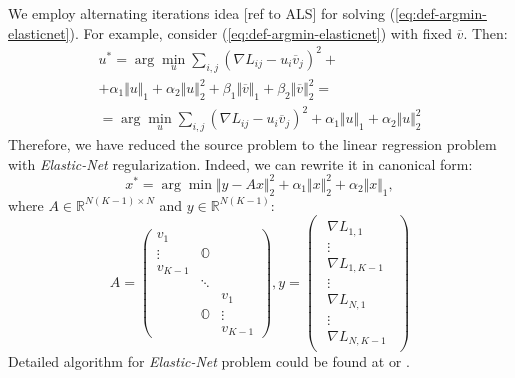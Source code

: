 \documentclass{article}
\begin{document}
We employ alternating iterations idea [ref to ALS] for solving (\ref{eq:def-argmin-elasticnet}). For example, consider (\ref{eq:def-argmin-elasticnet}) with fixed $\overline{v}$. Then:
\begin{multline*}
	u^{*} = \arg\min_{u}\sum_{i,j}\left(\nabla L_{ij}-u_{i}\overline{v}_{j}\right)^{2} + \\
	+ \alpha_{1}\Vert u\Vert_{1}+\alpha_{2}\Vert u\Vert_{2}^{2}
	+ \beta_{1}\Vert\overline{v}\Vert_{1}+\beta_{2}\Vert\overline{v}\Vert_{2}^{2} = \\
	= \arg\min_{u}\sum_{i,j}\left(\nabla L_{ij}-u_{i}\overline{v}_{j}\right)^{2}
	+ \alpha_{1}\Vert u\Vert_{1}+\alpha_{2}\Vert u\Vert_{2}^{2}
	\label{eq:elastic-net-argmin}
\end{multline*}
Therefore, we have reduced the source problem to the linear regression problem with \emph{Elastic-Net} regularization. Indeed, we can rewrite it in canonical form:
 \begin{equation*}
x^{*}=\arg\min\Vert y-Ax\Vert_{2}^{2}+\alpha_{1}\Vert x\Vert_{2}^{2}+\alpha_{2}\Vert x\Vert_{1},\label{eq:elastic-net-canon-argmin}
\end{equation*}
where $A \in \mathbb{R}^{N(K-1)\times N}$ and $y \in \mathbb{R}^{N(K-1)}$:
\[
A =
\begin{pmatrix}
	v_{1}     		& 				&		  \\
	\vdots			& \mathbb{O}  	&		  \\
	v_{K-1}			& 				&		  \\
					& \ddots		&		  \\
					&   			& v_{1}	  \\
					& \mathbb{O}	& \vdots  \\
					& 				& v_{K-1}
\end{pmatrix},
y=\begin{pmatrix}\begin{array}{l}
	\nabla L_{1,1}		\\
	\vdots				\\
	\nabla L_{1,K-1}	\\

	\vdots				\\
	
	\nabla L_{N,1}		\\
	\vdots				\\
	\nabla L_{N,K-1}
\end{array}\end{pmatrix}
\]
Detailed algorithm for \emph{Elastic-Net} problem could be found at \cite{elasticnet05} or \cite{Hastie_theelements}. 
\end{document}
